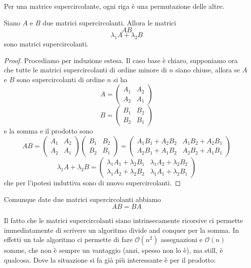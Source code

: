 \documentclass[11pt]{scrartcl}
\newcommand{\bigo}[1]{\mathcal{O}\!\left(#1\right)}
\begin{document}
	\begin{lemma}
		Per una matrice supercircolante, ogni riga è una permutazione delle altre.
	\end{lemma}
	\begin{lemma}[Chiusura]
		Siano $A$ e $B$ due matrici supercircolanti. Allora le matrici
		$$
		AB
		$$
		$$
		\lambda_1A+\lambda_2B
		$$
		sono matrici supercircolanti.
	\end{lemma}
	\begin{proof}
		Procediamo per induzione estesa. Il caso base è chiaro, supponiamo ora che tutte le matrici supercircolanti di ordine minore di $n$ siano chiuse, allora se $A$ e $B$ sono supercircolanti di ordine $n$ si ha
		$$A=\left(
		\begin{array}{c|c}
			A_1 & A_2 \\
			\hline
			A_2 & A_1
		\end{array}
		\right)$$
		$$B=
		\left(
		\begin{array}{c|c}
			B_1 & B_2 \\
			B_2 & B_1
		\end{array}
		\right)
		$$ 
		e la somma e il prodotto sono
		$$AB=
		\left(
		\begin{array}{c|c}
			A_1 & A_2 \\
			\hline
			A_2 & A_1
		\end{array}
		\right)
		\left(
		\begin{array}{c|c}
			B_1 & B_2 \\
			\hline
			B_2 & B_1
		\end{array}
		\right)
		=
		\left(
		\begin{array}{c|c}
			A_1B_1+A_2B_2 & A_1B_2+A_2B_1 \\
			\hline
			A_2B_1+A_1B_2 & A_2B_2+A_1B_1
		\end{array}
		\right)
		$$
		$$
		\lambda_1A+\lambda_2B=
		\left(
		\begin{array}{c|c}
			\lambda_1 A_1+\lambda_2 B_1 & \lambda_1A_2+\lambda_2B_2 \\
			\hline
			\lambda_1 A_2+\lambda_2 B_2 & \lambda_1A_1+\lambda_2B_1
		\end{array}
		\right)
		$$
		che per l'ipotesi induttiva sono di nuovo supercircolanti.
	\end{proof}
	\begin{lemma}
		Comunque date due matrici supercircolanti abbiamo
		$$AB=BA$$
	\end{lemma}
	Il fatto che le matrici supercircolanti siano intrinsecamente ricorsive ci permette immediatamente di scrivere un algoritmo divide and conquer per la somma. In effetti un tale algoritmo ci permette di fare $\bigo{n^2}$ assegnazioni e $\bigo{n}$ somme, che non è sempre un vantaggio (anzi, spesso non lo è), ma still, è qualcosa. Dove la situazione si fa già più interessante è per il prodotto:
\end{document}
